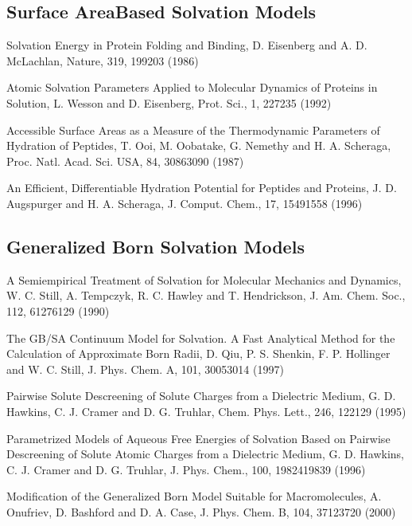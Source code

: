 \documentclass[letterpaper,11pt,english]{sphinxmanual}
\begin{document}
\subsection{Surface Area\sphinxhyphen{}Based Solvation Models}
\label{\detokenize{text/references:surface-area-based-solvation-models}}
\sphinxAtStartPar
Solvation Energy in Protein Folding and Binding, D. Eisenberg and A. D. McLachlan, Nature, 319, 199\sphinxhyphen{}203 (1986)

\sphinxAtStartPar
Atomic Solvation Parameters Applied to Molecular Dynamics of Proteins in Solution, L. Wesson and D. Eisenberg, Prot. Sci., 1, 227\sphinxhyphen{}235 (1992)

\sphinxAtStartPar
Accessible Surface Areas as a Measure of the Thermodynamic Parameters of Hydration of Peptides, T. Ooi, M. Oobatake, G. Nemethy and H. A. Scheraga, Proc. Natl. Acad. Sci. USA, 84, 3086\sphinxhyphen{}3090 (1987)

\sphinxAtStartPar
An Efficient, Differentiable Hydration Potential for Peptides and Proteins, J. D. Augspurger and H. A. Scheraga, J. Comput. Chem., 17, 1549\sphinxhyphen{}1558 (1996)


\subsection{Generalized Born Solvation Models}
\label{\detokenize{text/references:generalized-born-solvation-models}}
\sphinxAtStartPar
A Semiempirical Treatment of Solvation for Molecular Mechanics and Dynamics, W. C. Still, A. Tempczyk, R. C. Hawley and T. Hendrickson, J. Am. Chem. Soc., 112, 6127\sphinxhyphen{}6129 (1990)

\sphinxAtStartPar
The GB/SA Continuum Model for Solvation. A Fast Analytical Method for the Calculation of Approximate Born Radii, D. Qiu, P. S. Shenkin, F. P. Hollinger and W. C. Still, J. Phys. Chem. A, 101, 3005\sphinxhyphen{}3014 (1997)

\sphinxAtStartPar
Pairwise Solute Descreening of Solute Charges from a Dielectric Medium, G. D. Hawkins, C. J. Cramer and D. G. Truhlar, Chem. Phys. Lett., 246, 122\sphinxhyphen{}129 (1995)

\sphinxAtStartPar
Parametrized Models of Aqueous Free Energies of Solvation Based on Pairwise Descreening of Solute Atomic Charges from a Dielectric Medium, G. D. Hawkins, C. J. Cramer and D. G. Truhlar, J. Phys. Chem., 100, 19824\sphinxhyphen{}19839 (1996)

\sphinxAtStartPar
Modification of the Generalized Born Model Suitable for Macromolecules, A. Onufriev, D. Bashford and D. A. Case, J. Phys. Chem. B, 104, 3712\sphinxhyphen{}3720 (2000)
\end{document}
